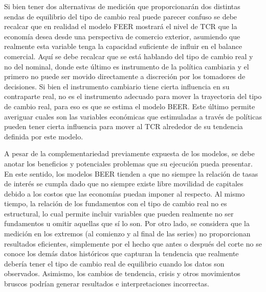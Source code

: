 \documentclass[12pt,letterpaper]{article}
\begin{document}
Si bien tener dos alternativas de medición que proporcionarán dos distintas sendas de equilibrio del tipo de cambio real puede parecer confuso se debe recalcar que en realidad el modelo FEER mostrará el nivel de TCR que la economía desea desde una perspectiva de comercio exterior, asumiendo que realmente esta variable tenga la capacidad suficiente de influir en el balance comercial. Aquí se debe recalcar que se está hablando del tipo de cambio real y no del nominal, donde este último es instrumento de la política cambiaria y el primero no puede ser movido directamente a discreción por los tomadores de decisiones. Si bien el instrumento cambiario tiene cierta influencia en su contraparte real, no es el instrumento adecuado para mover la trayectoria del tipo de cambio real, para eso es que se estima el modelo BEER. Este último permite averiguar cuales son las variables económicas que estimuladas a través de políticas pueden tener cierta influencia para mover al TCR alrededor de su tendencia definida por este modelo.

A pesar de la complementariedad previamente expuesta de los modelos, se debe anotar los beneficios y potenciales problemas que su ejecución pueda presentar. En este sentido, los modelos BEER tienden a que no siempre la relación de tasas de interés se cumpla dado que no siempre existe libre movilidad de capitales debido a los costos que las economías puedan imponer al respecto. Al mismo tiempo, la relación de los fundamentos con el tipo de cambio real no es estructural, lo cual permite incluir variables que pueden realmente no ser fundamentos u omitir aquellas que sí lo son. Por otro lado, se considera que la medición en los extremos (al comienzo y al final de las series) no proporcionan resultados eficientes, simplemente por el hecho que antes o después del corte no se conoce los demás datos históricos que capturan la tendencia que realmente debería tener el tipo de cambio real de equilibrio cuando los datos son observados. Asimismo, los cambios de tendencia, crisis y otros movimientos bruscos podrían generar resultados e interpretaciones incorrectas.
\end{document}
